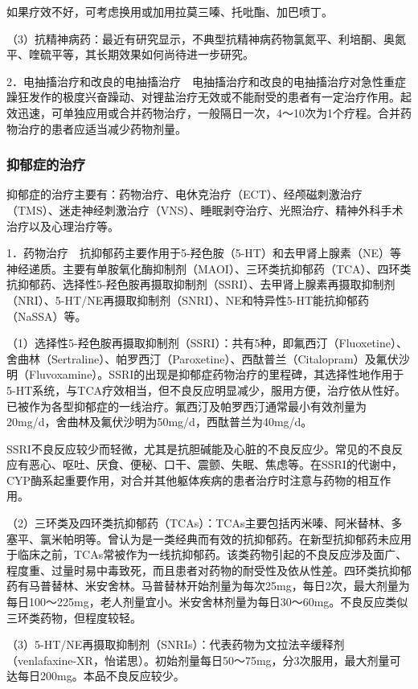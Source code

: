 如果疗效不好，可考虑换用或加用拉莫三嗪、托吡酯、加巴喷丁。

（3）抗精神病药：最近有研究显示，不典型抗精神病药物氯氮平、利培酮、奥氮平、喹硫平等，其长期效果如何尚待进一步研究。

2．电抽搐治疗和改良的电抽搐治疗　电抽搐治疗和改良的电抽搐治疗对急性重症躁狂发作的极度兴奋躁动、对锂盐治疗无效或不能耐受的患者有一定治疗作用。起效迅速，可单独应用或合并药物治疗，一般隔日一次，4～10次为1个疗程。合并药物治疗的患者应适当减少药物剂量。

\subsubsection{抑郁症的治疗}

抑郁症的治疗主要有：药物治疗、电休克治疗（ECT）、经颅磁刺激治疗（TMS）、迷走神经刺激治疗（VNS）、睡眠剥夺治疗、光照治疗、精神外科手术治疗以及心理治疗等。

1．药物治疗　抗抑郁药主要作用于5-羟色胺（5-HT）和去甲肾上腺素（NE）等神经递质。主要有单胺氧化酶抑制剂（MAOI）、三环类抗抑郁药（TCA）、四环类抗抑郁药、选择性5-羟色胺再摄取抑制剂（SSRI）、去甲肾上腺素再摄取抑制剂（NRI）、5-HT/NE再摄取抑制剂（SNRI）、NE和特异性5-HT能抗抑郁药（NaSSA）等。

（1）选择性5-羟色胺再摄取抑制剂（SSRI）：共有5种，即氟西汀（Fluoxetine）、舍曲林（Sertraline）、帕罗西汀（Paroxetine）、西酞普兰（Citalopram）及氟伏沙明（Fluvoxamine）。SSRI的出现是抑郁症药物治疗的里程碑，其选择性地作用于5-HT系统，与TCA疗效相当，但不良反应明显减少，服用方便，治疗依从性好。已被作为各型抑郁症的一线治疗。氟西汀及帕罗西汀通常最小有效剂量为20mg/d，舍曲林及氟伏沙明为50mg/d，西酞普兰为40mg/d。

SSRI不良反应较少而轻微，尤其是抗胆碱能及心脏的不良反应少。常见的不良反应有恶心、呕吐、厌食、便秘、口干、震颤、失眠、焦虑等。在SSRI的代谢中，CYP酶系起重要作用，对合并其他躯体疾病的患者治疗时注意与药物的相互作用。

（2）三环类及四环类抗抑郁药（TCAs）：TCAs主要包括丙米嗪、阿米替林、多塞平、氯米帕明等。曾认为是一类经典而有效的抗抑郁药。在新型抗抑郁药未应用于临床之前，TCAs常被作为一线抗抑郁药。该类药物引起的不良反应涉及面广、程度重、过量时易中毒致死，而且患者对药物的耐受性及依从性差。四环类抗抑郁药有马普替林、米安舍林。马普替林开始剂量为每次25mg，每日2次，最大剂量为每日100～225mg，老人剂量宜小。米安舍林剂量为每日30～60mg。不良反应类似三环类药物，但程度较轻。

（3）5-HT/NE再摄取抑制剂（SNRIs）：代表药物为文拉法辛缓释剂（venlafaxine-XR，怡诺思）。初始剂量每日50～75mg，分3次服用，最大剂量可达每日200mg。本品不良反应较少。

